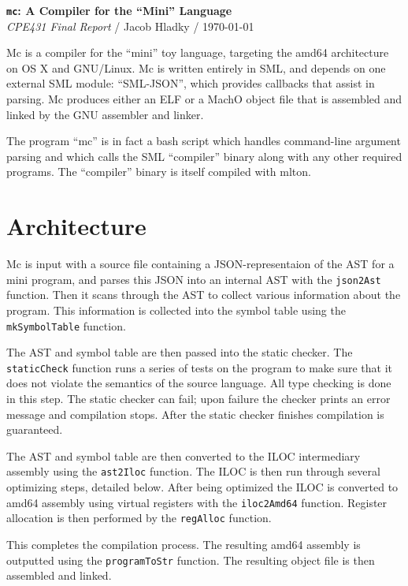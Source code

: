 \documentclass[12pt]{article}
\begin{document}
{\centering\Large
  \textbf{\texttt{mc}: A Compiler for the ``Mini'' Language}\\
         {\normalsize{\em CPE431 Final Report} / Jacob Hladky / \today}
         \par
}

\vspace{0.5cm}

Mc is a compiler for the ``mini'' toy language, targeting the amd64 architecture on OS X and GNU/Linux. Mc is written entirely in SML, and depends on one external SML module: ``SML-JSON'', which provides callbacks that assist in parsing. Mc produces either an ELF or a MachO object file that is assembled and linked by the GNU assembler and linker.

The program ``mc'' is in fact a bash script which handles command-line argument parsing and which calls the SML ``compiler'' binary along with any other required programs. The ``compiler'' binary is itself compiled with mlton.

\section*{Architecture}
Mc is input with a source file containing a JSON-representaion of the AST for a mini program, and parses this JSON into an internal AST with the \texttt{json2Ast} function. Then it scans through the AST to collect various information about the program. This information is collected into the symbol table using the \texttt{mkSymbolTable} function.

The AST and symbol table are then passed into the static checker. The \texttt{staticCheck} function runs a series of tests on the program to make sure that it does not violate the semantics of the source language. All type checking is done in this step. The static checker can fail; upon failure the checker prints an error message and compilation stops. After the static checker finishes compilation is guaranteed.

The AST and symbol table are then converted to the ILOC intermediary assembly using the \texttt{ast2Iloc} function. The ILOC is then run through several optimizing steps, detailed below. After being optimized the ILOC is converted to amd64 assembly using virtual registers with the \texttt{iloc2Amd64} function. Register allocation is then performed by the \texttt{regAlloc} function.

This completes the compilation process. The resulting amd64 assembly is outputted using the \texttt{programToStr} function. The resulting object file is then assembled and linked.
\end{document}
